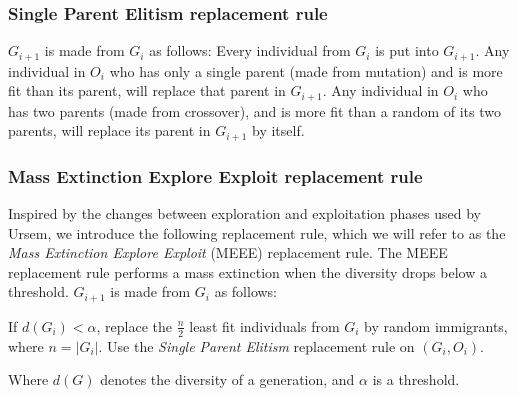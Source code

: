 \subsubsection{Single Parent Elitism replacement rule}
$G_{i+1}$ is made from $G_i$ as follows:
Every individual from $G_i$ is put into $G_{i+1}$.
Any individual in $O_i$ who has only a single parent (made from mutation) and is more fit than its parent, will replace that parent in $G_{i+1}$.
Any individual in $O_i$ who has two parents (made from crossover), and is more fit than a random of its two parents, will replace its parent in $G_{i+1}$ by itself.

\subsubsection{Mass Extinction Explore Exploit replacement rule}
Inspired by the changes between exploration and exploitation phases used by Ursem\cite{ursem2002diversity}, we introduce the following replacement rule, which we will refer to as the \emph{Mass Extinction Explore Exploit} (MEEE) replacement rule.
The MEEE replacement rule performs a mass extinction when the diversity drops below a threshold.
$G_{i+1}$ is made from $G_i$ as follows:

If $d(G_i) < \alpha$, replace the $\frac{n}{2}$ least fit individuals from $G_i$ by random immigrants, where $n = \lvert G_i \rvert$.
Use the \emph{Single Parent Elitism} replacement rule on $(G_i, O_i)$.

Where $d(G)$ denotes the diversity of a generation, and $\alpha$ is a threshold. 


